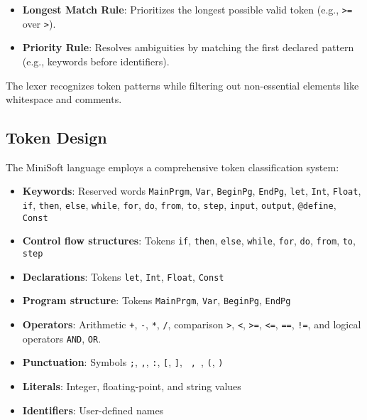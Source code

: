 \documentclass[12pt,a4paper]{article}
\begin{document}
\begin{itemize}
	\item \textbf{Longest Match Rule}: Prioritizes the longest possible valid token (e.g., \texttt{>=} over \texttt{>}).

	\item \textbf{Priority Rule}: Resolves ambiguities by matching the first declared pattern (e.g., keywords before identifiers).
\end{itemize}

The lexer recognizes token patterns while filtering out non-essential elements like whitespace and comments.

\subsection{Token Design}
The MiniSoft language employs a comprehensive token classification system:

\begin{itemize}
	\item \textbf{Keywords}: Reserved words \texttt{MainPrgm}, \texttt{Var}, \texttt{BeginPg}, \texttt{EndPg}, \texttt{let}, \texttt{Int}, \texttt{Float}, \texttt{if}, \texttt{then}, \texttt{else}, \texttt{while}, \texttt{for}, \texttt{do}, \texttt{from}, \texttt{to}, \texttt{step}, \texttt{input}, \texttt{output}, \texttt{@define}, \texttt{Const}
	\item \textbf{Control flow structures}: Tokens \texttt{if}, \texttt{then}, \texttt{else}, \texttt{while}, \texttt{for}, \texttt{do}, \texttt{from}, \texttt{to}, \texttt{step}
	\item \textbf{Declarations}: Tokens \texttt{let}, \texttt{Int}, \texttt{Float}, \texttt{Const}
	\item \textbf{Program structure}: Tokens \texttt{MainPrgm}, \texttt{Var}, \texttt{BeginPg}, \texttt{EndPg}
	\item \textbf{Operators}: Arithmetic \texttt{+}, \texttt{-}, \texttt{*}, \texttt{/}, comparison \texttt{>}, \texttt{<}, \texttt{>=}, \texttt{<=}, \texttt{==}, \texttt{!=}, and logical operators \texttt{AND}, \texttt{OR}.
	\item \textbf{Punctuation}: Symbols \texttt{;}, \texttt{,}, \texttt{:}, \texttt{[}, \texttt{]}, \texttt{{} , \texttt{}}, \texttt{(}, \texttt{)}
	\item \textbf{Literals}: Integer, floating-point, and string values
	\item \textbf{Identifiers}: User-defined names
\end{itemize}
\end{document}
